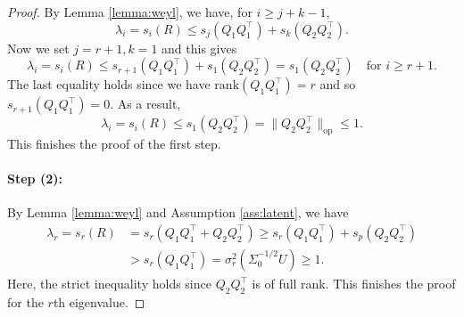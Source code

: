 \documentclass[11pt]{article}
\newcommand{\eigen}{s} %
\newcommand{\0}{{\mathbf{0}}}
\newcommand{\op}{{\mathrm{op}}}
\newcommand{\rank}{{\mathrm{rank}}}
\begin{document}
\begin{proof}
By Lemma \ref{lemma:weyl}, we have, for $i\geq j+k-1$,
\begin{equation*}
\lambda_i= \eigen_i(R) \leq \eigen_j(Q_1Q_1^\top )+\eigen_k(Q_2Q_2^\top ).
\end{equation*}
Now we set $j = r+1, k=1$ and this gives\begin{equation*}
\lambda_{i}{ = \eigen_i(R) }\leq \eigen_{r+1}(Q_1Q_1^\top )+\eigen_1(Q_2Q_2^\top )=\eigen_1(Q_2Q_2^\top )\quad \text{for $i\geq r+1$}.
\end{equation*}
The last equality holds since we have $\rank(Q_1Q_1^\top )=r$ and so $\eigen_{r+1}(Q_1Q_1^\top )=0$. 
As a result, \begin{equation*}
\lambda_i{ = \eigen_i(R) }\leq \eigen_1(Q_2Q_2^\top )=\|Q_2Q_2^\top \|_\op
\leq 1.
\end{equation*}
 This finishes the proof of the first step.

\paragraph{Step (2):} 
By Lemma \ref{lemma:weyl} and Assumption \ref{ass:latent}, 
we have 
\begin{align*}
\lambda_r { = \eigen_r(R) }
& =\eigen_r(Q_1Q_1^\top +Q_2Q_2^\top )
\geq  \eigen_r(Q_1 Q_1^\top) + \eigen_p(Q_2 Q_2^\top) \\
& > \eigen_r(Q_1 Q_1^\top)
= \sigma_r^2(\Sigma_0^{-1/2}U)
\ge 1.
\end{align*}
Here, the strict inequality holds since $Q_2Q_2^\top$ is of full rank.
This finishes the proof for the $r$th eigenvalue.


\end{proof}
\end{document}

